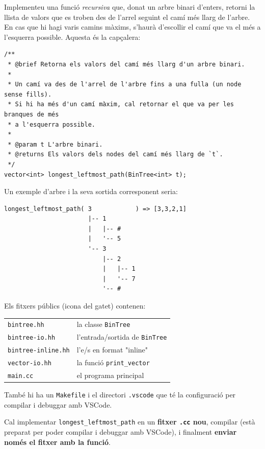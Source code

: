 
\Statement

Implementeu una funció \emph{recursiva} que, donat un arbre binari d'enters, retorni la llista de valors que es troben des de l'arrel seguint el camí més llarg de l'arbre. En cas que hi hagi varis camins màxims, s'haurà d'escollir el camí que va el més a l'esquerra possible. Aquesta és la capçalera:

\begin{verbatim}
/**
 * @brief Retorna els valors del camí més llarg d'un arbre binari.
 *
 * Un camí va des de l'arrel de l'arbre fins a una fulla (un node sense fills).
 * Si hi ha més d'un camí màxim, cal retornar el que va per les branques de més
 * a l'esquerra possible.
 *
 * @param t L'arbre binari.
 * @returns Els valors dels nodes del camí més llarg de `t`.
 */
vector<int> longest_leftmost_path(BinTree<int> t);
\end{verbatim}

Un exemple d'arbre i la seva sortida corresponent seria:

\begin{verbatim}
longest_leftmost_path( 3            ) => [3,3,2,1]
                       |-- 1        
                       |   |-- #    
                       |   '-- 5    
                       '-- 3        
                           |-- 2    
                           |   |-- 1
                           |   '-- 7
                           '-- #    
\end{verbatim}

Els fitxers públics (icona del gatet) contenen:
\smallskip
\begin{tabular}{ll}
 \verb|bintree.hh| & la classe \verb|BinTree| \\
 \verb|bintree-io.hh| & l'entrada/sortida de \verb|BinTree| \\
 \verb|bintree-inline.hh| & l'e/s en format "inline" \\
 \verb|vector-io.hh| & la funció \verb|print_vector| \\
 \verb|main.cc| & el programa principal \\
\end{tabular}

També hi ha un \verb|Makefile| i el directori \verb|.vscode| que té la configuració per compilar i debuggar amb VSCode.

\medskip

Cal implementar \verb|longest_leftmost_path| en un \textbf{fitxer \texttt{.cc} nou}, compilar (està preparat per poder compilar i debuggar amb VSCode), i finalment \textbf{enviar només el fitxer amb la funció}.

